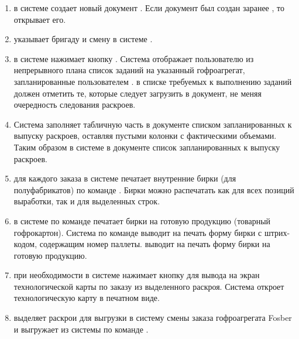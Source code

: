 \begin{enumerate}
\item  \gaoperator в системе \gofro создает новый документ . Если документ был создан заранее \planner, то \gaoperator открывает его.
\item  \gaoperator указывает бригаду и смену в системе \gofro.
\item  \gaoperator в системе \gofro нажимает кнопку . Система \gofro отображает пользователю из непрерывного плана список заданий на указанный гофроагрегат, запланированные пользователем \planner. \gaoperator в списке требуемых к выполнению заданий должен отметить те, которые следует загрузить в документ, не меняя очередность следования раскроев. 
\item Система \gofro заполняет табличную часть в документе  списком запланированных к выпуску раскроев, оставляя пустыми колонки с фактическими объемами. Таким образом  в системе \gofro в документе  список запланированных к выпуску раскроев.
\item  \gaoperator	для каждого заказа  в системе \gofro печатает внутренние бирки (для полуфабрикатов) по команде . Бирки можно распечатать как для всех позиций выработки, так и для выделенных строк.
\item  \gaoperator в системе \gofro по команде  печатает бирки на готовую продукцию (товарный гофрокартон).%
Система \gofro по команде 
\ifnum{}
   выводит на печать форму бирки с штрих-кодом, 
   содержащим %
   номер паллеты.
\else
   выводит на печать форму бирки на готовую продукцию. 
\fi
\item  \gaoperator	при необходимости в системе \gofro  нажимает кнопку  для вывода на экран технологической  карты по заказу из выделенного раскроя. Система \gofro откроет технологическую карту в печатном виде.
\item  \gaoperator выделяет раскрои для выгрузки в систему смены заказа \syncro  гофроагрегата Fosber и выгружает из системы \gofro  по команде .

\end{enumerate}
